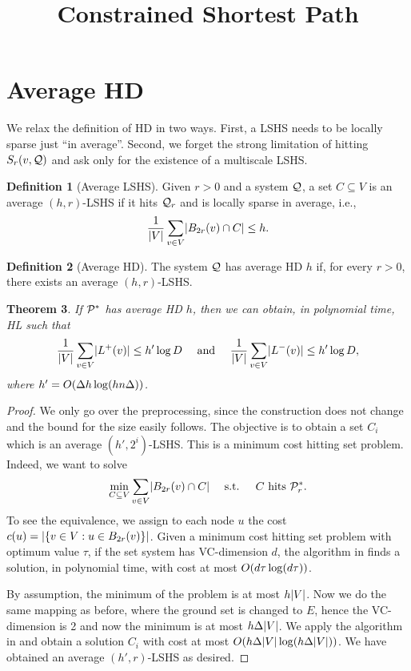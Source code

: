 \documentclass[letterpaper,11pt]{article}
\title{\vspace{-1cm} \bf Constrained Shortest Path \vspace{-1.3cm}}
\author{}
\theoremstyle{plain}
\newtheorem{theorem}{Theorem}[section]
\theoremstyle{definition}
\newtheorem{definition}[theorem]{Definition}
\begin{document}
\maketitle


\section{Average HD}

We relax the definition of HD in two ways.
First, a LSHS needs to be locally sparse just ``in average''.
Second, we forget the strong limitation of hitting $S_r(v,\mathcal{Q})$ and ask only for the existence of a multiscale LSHS.

\begin{definition}[Average LSHS]
Given $r>0$ and a system $\mathcal{Q}$, a set $C\subseteq V$ is an average $(h,r)$-LSHS if it hits $\mathcal{Q}_r$ and is locally sparse in average, i.e.,
\[
\frac{1}{\lvert V\rvert}\sum_{v\in V} \lvert B_{2r}(v)\cap C\rvert \leq h.
\]
\end{definition}

\begin{definition}[Average HD]
The system $\mathcal{Q}$ has average HD $h$ if, for every $r>0$, there exists an average $(h,r)$-LSHS.
\end{definition}

\begin{theorem}\label{theo:preproc_avg}
If $\mathcal{P}^*$ has average HD $h$, then we can obtain, in polynomial time, HL such that 
\[
\frac{1}{\lvert V\rvert}\sum_{v\in V} \lvert L^+(v)\rvert \leq h'\log D \quad \text{ and }\quad
\frac{1}{\lvert V\rvert}\sum_{v\in V} \lvert L^-(v)\rvert \leq h'\log D,
\]
where $h'=O(\Delta h\log (hn\Delta))$.
\end{theorem}
\begin{proof}
We only go over the preprocessing, since the construction does not change and the bound for the size easily follows. 
The objective is to obtain a set $C_i$ which is an average $(h',2^i)$-LSHS.
This is a minimum cost hitting set problem.
Indeed, we want to solve
\[
\min_{C\subseteq V} \sum_{v\in V}\lvert B_{2r}(v)\cap C\rvert  \quad \text{ s.t. } \quad C \text{ hits } \mathcal{P}^*_r.
\]
To see the equivalence, we assign to each node $u$ the cost $c(u)=\lvert\{v\in V: u\in B_{2r}(v)\}\rvert$.
Given a minimum cost hitting set problem with optimum value $\tau$, if the set system has VC-dimension $d$, the algorithm in \cite{vc_dim_hitting} finds a solution, in polynomial time, with cost at most $O(d\tau\log(d\tau))$.

By assumption, the minimum of the problem is at most $h\lvert V\rvert$.
Now we do the same mapping as before, where the ground set is changed to $E$, hence the VC-dimension is 2 and now the minimum is at most $h\Delta\lvert V\rvert$.
We apply the algorithm in \cite{vc_dim_hitting} and obtain a solution $C_i$ with cost at most $O(h\Delta\lvert V\rvert\log(h\Delta\lvert V\rvert))$.
We have obtained an average $(h',r)$-LSHS as desired.
\end{proof}
\end{document}
